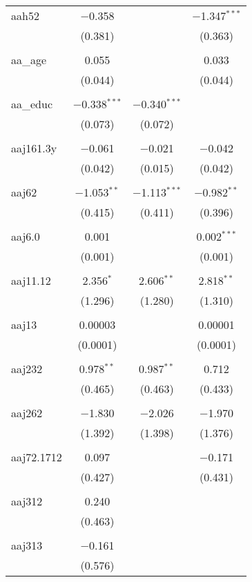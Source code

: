 \begin{table}[!htbp]
\begin{tabular}{@{\extracolsep{5pt}}lccc}
 aah52 & $-$0.358 &  & $-$1.347$^{***}$ \\ 
  & (0.381) &  & (0.363) \\ 
  & & & \\ 
 aa\_age & 0.055 &  & 0.033 \\ 
  & (0.044) &  & (0.044) \\ 
  & & & \\ 
 aa\_educ & $-$0.338$^{***}$ & $-$0.340$^{***}$ &  \\ 
  & (0.073) & (0.072) &  \\ 
  & & & \\ 
 aaj161.3y & $-$0.061 & $-$0.021 & $-$0.042 \\ 
  & (0.042) & (0.015) & (0.042) \\ 
  & & & \\ 
 aaj62 & $-$1.053$^{**}$ & $-$1.113$^{***}$ & $-$0.982$^{**}$ \\ 
  & (0.415) & (0.411) & (0.396) \\ 
  & & & \\ 
 aaj6.0 & 0.001 &  & 0.002$^{***}$ \\ 
  & (0.001) &  & (0.001) \\ 
  & & & \\ 
 aaj11.12 & 2.356$^{*}$ & 2.606$^{**}$ & 2.818$^{**}$ \\ 
  & (1.296) & (1.280) & (1.310) \\ 
  & & & \\ 
 aaj13 & 0.00003 &  & 0.00001 \\ 
  & (0.0001) &  & (0.0001) \\ 
  & & & \\ 
 aaj232 & 0.978$^{**}$ & 0.987$^{**}$ & 0.712 \\ 
  & (0.465) & (0.463) & (0.433) \\ 
  & & & \\ 
 aaj262 & $-$1.830 & $-$2.026 & $-$1.970 \\ 
  & (1.392) & (1.398) & (1.376) \\ 
  & & & \\ 
 aaj72.1712 & 0.097 &  & $-$0.171 \\ 
  & (0.427) &  & (0.431) \\ 
  & & & \\ 
 aaj312 & 0.240 &  &  \\ 
  & (0.463) &  &  \\ 
  & & & \\ 
 aaj313 & $-$0.161 &  &  \\ 
  & (0.576) &  &  \\ 

\end{tabular}
\end{table}
